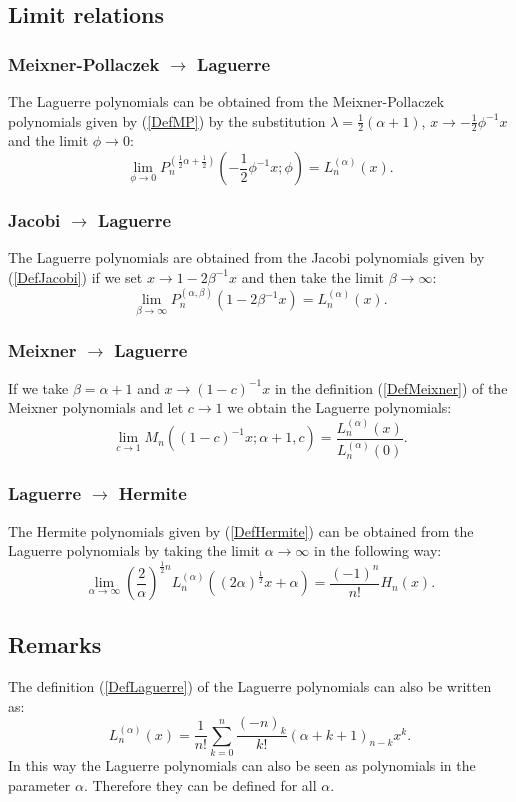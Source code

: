 \documentclass[envcountchap,graybox]{svmono}
\newcounter{rom}
\begin{document}
\subsection*{Limit relations}

\subsubsection*{Meixner-Pollaczek $\rightarrow$ Laguerre}
The Laguerre polynomials can be obtained from the Meixner-Pollaczek polynomials given by
(\ref{DefMP}) by the substitution $\lambda=\frac{1}{2}(\alpha+1)$,
$x\rightarrow -\frac{1}{2}\phi^{-1}x$ and the limit $\phi\rightarrow 0$:
$$\lim_{\phi\rightarrow 0}
P_n^{(\frac{1}{2}\alpha+\frac{1}{2})}(-\textstyle\frac{1}{2}\phi^{-1}x;\phi)=L_n^{(\alpha)}(x).$$

\subsubsection*{Jacobi $\rightarrow$ Laguerre}
The Laguerre polynomials are obtained from the Jacobi polynomials given by (\ref{DefJacobi})
if we set $x\rightarrow 1-2\beta^{-1}x$ and then take the limit $\beta\rightarrow\infty$:
$$\lim_{\beta\rightarrow\infty}
P_n^{(\alpha,\beta)}(1-2\beta^{-1}x)=L_n^{(\alpha)}(x).$$

\subsubsection*{Meixner $\rightarrow$ Laguerre}
If we take $\beta=\alpha+1$ and $x\rightarrow (1-c)^{-1}x$ in the definition
(\ref{DefMeixner}) of the Meixner polynomials and let $c\rightarrow 1$ we obtain
the Laguerre polynomials:
$$\lim_{c\rightarrow 1}
M_n((1-c)^{-1}x;\alpha+1,c)=\frac{L_n^{(\alpha)}(x)}{L_n^{(\alpha)}(0)}.$$

\subsubsection*{Laguerre $\rightarrow$ Hermite}
The Hermite polynomials given by (\ref{DefHermite}) can be obtained from the Laguerre
polynomials by taking the limit $\alpha\rightarrow\infty$ in the following way:
\begin{equation}
\lim_{\alpha\rightarrow\infty}
\left(\frac{2}{\alpha}\right)^{\frac{1}{2}n}
L_n^{(\alpha)}((2\alpha)^{\frac{1}{2}}x+\alpha)=\frac{(-1)^n}{n!}H_n(x).
\end{equation}

\subsection*{Remarks}
The definition (\ref{DefLaguerre}) of the Laguerre polynomials can also be
written as:
$$L_n^{(\alpha)}(x)=\frac{1}{n!}\sum_{k=0}^n\frac{(-n)_k}{k!}(\alpha+k+1)_{n-k}x^k.$$
In this way the Laguerre polynomials can also be seen as polynomials in the parameter $\alpha$.
Therefore they can be defined for all $\alpha$.
\end{document}
